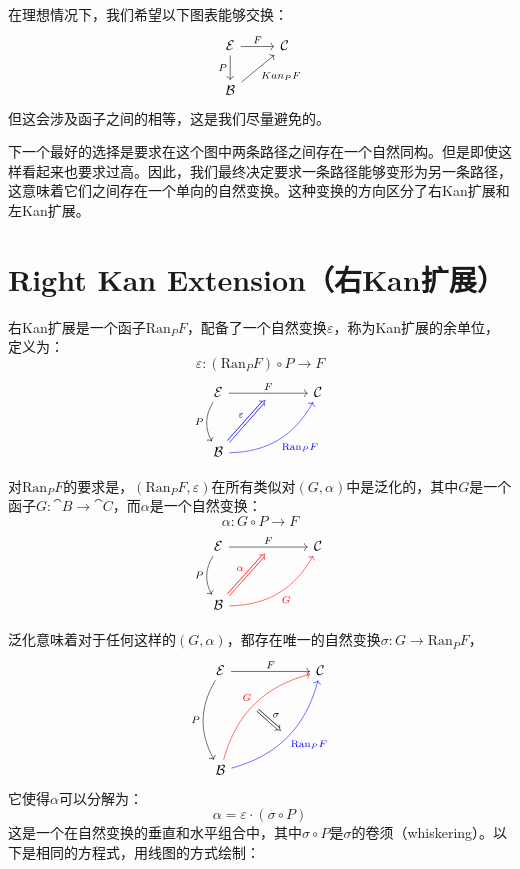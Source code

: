 \documentclass[DaoFP]{subfiles}
\begin{document}
 在理想情况下，我们希望以下图表能够交换：
 \[
  \begin{tikzcd} \cat E
  \arrow[r, "F"]
  \arrow[d, "P"']
  & \cat C
  \\
  \cat B
  \arrow[ur, "Kan_P F"']
  \end{tikzcd}
 \]
 但这会涉及函子之间的相等，这是我们尽量避免的。

 下一个最好的选择是要求在这个图中两条路径之间存在一个自然同构。但是即使这样看起来也要求过高。因此，我们最终决定要求一条路径能够变形为另一条路径，这意味着它们之间存在一个单向的自然变换。这种变换的方向区分了右Kan扩展和左Kan扩展。

 \section{Right Kan Extension（右Kan扩展）}

 右Kan扩展是一个函子$\text{Ran}_P F$，配备了一个自然变换$\varepsilon$，称为Kan扩展的余单位，定义为：
 \[ \varepsilon \colon (\text{Ran}_P F) \circ P \to F\]
 \[
  \begin{tikzcd} [row sep=1cm, column sep=1cm]
   \cat E
   \arrow[rr, "F", "" {name=ID, below} ]
   \arrow[d, bend right, "P"']
   && \cat C
   \\
   \cat B
   \arrow[urr, blue, bend right, "\text{Ran}_P F"']
   \arrow[Rightarrow, blue, "\varepsilon",  to=ID]
  \end{tikzcd}
 \]

 对$\text{Ran}_P F$的要求是，$(\text{Ran}_P F, \varepsilon)$在所有类似对$(G, \alpha)$中是泛化的，其中$G$是一个函子$G \colon \cat B \to \cat C$，而$\alpha$是一个自然变换：
 \[ \alpha \colon G \circ P \to F \]
 \[
  \begin{tikzcd} [row sep=1cm, column sep=1cm]
   \cat E
   \arrow[rr, "F", "" {name=ID, below} ]
   \arrow[d, bend right, "P"']
   && \cat C
   \\
   \cat B
   \arrow[urr, red, bend right, "G"']
   \arrow[Rightarrow, red, "\alpha",  to=ID]
  \end{tikzcd}
 \]

 泛化意味着对于任何这样的$(G, \alpha)$，都存在唯一的自然变换$\sigma \colon G \to \text{Ran}_P F$，
 \[
  \begin{tikzcd}[row sep=2cm, column sep=2cm]
   \cat E  \ar[d, bend right, "P"', "" {name=P}]
   \ar[r, "F", ""  {name=F, below, near start, bend right}]
   &
   \cat C
   \\
   \cat B
   \ar[ur, red, bend left, "G", "" {name=G, below}]
   \ar[ur, blue, bend right, "\text{Ran}_P F"', "" {name=Ran}]
   \arrow[Rightarrow, "\sigma", from=G, to=Ran]
  \end{tikzcd}
 \]
 它使得$\alpha$可以分解为：
 \[ \alpha = \varepsilon \cdot (\sigma \circ P) \]
 这是一个在自然变换的垂直和水平组合中，其中$\sigma \circ P$是$\sigma$的卷须（whiskering）。以下是相同的方程式，用线图的方式绘制：
\end{document}
